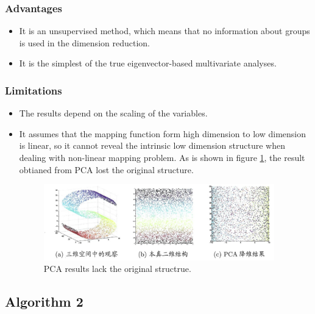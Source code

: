 \documentclass{article}
\theoremstyle{definition}
\numberwithin{equation}{section}
\numberwithin{figure}{section}
\begin{document}
\subsubsection{Advantages}
\begin{itemize}
\item It is an unsupervised method, which means that no information about groups is used in the dimension reduction.
\item It is the simplest of the true eigenvector-based multivariate analyses.
\end{itemize}

\subsubsection{Limitations}
\begin{itemize}
\item The results depend on the scaling of the variables. 
\item It assumes that the mapping function form high dimension to low dimension is linear, so it cannot reveal the intrinsic low dimension structure when dealing with non-linear mapping problem. As is shown in figure \ref{pca}, the result obtianed from PCA lost the original structure.
\begin{figure}[htbp]
	\centering
	\includegraphics[width=10cm]{problem1/pca.jpg}
\caption{PCA results lack the original structrue.}
\label{pca}
\end{figure}

\end{itemize}
\subsection{Algorithm 2}
\end{document}
